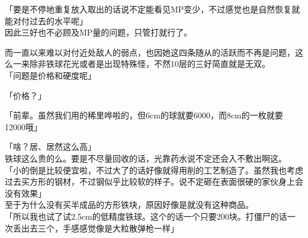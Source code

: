 「要是不停地重复放入取出的话说不定能看见MP变少，不过感觉也是自然恢复就能对付过去的水平呢」\\

因此三好也不必顾及MP量的问题，只管打就行了。

而一直以来难以对付近处敌人的弱点，也因她这四条随从的活跃而不再是问题，这么一来除非铁球花光或者是出现特殊怪，不然10层的三好简直就是无双。\\

「问题是价格和硬度呢」

「价格？」

「前辈。虽然我们用的稀里哗啦的，但6cm的球就要6000，而8cm的一枚就要12000哦」

「啥？居、居然这么高」\\

铁球这么贵的么。要是不尽量回收的话，光靠药水说不定还会入不敷出啊这。\\

「小的倒是比较便宜啦，不过大了的话好像就得用削的工艺制造了。虽然我也考虑过去买方形的钢材，不过钢似乎比较软的样子。说不定砸在表面很硬的家伙身上会没有效果」\\

至于为什么没有买半成品的方形铁块，原因好像是就没有这种商品。\\

「所以我也试了试2.5cm的低精度铁球。这个的话一个只要200块。打僵尸的话一次丢出去三个，手感感觉像是大粒散弹枪一样」\\

